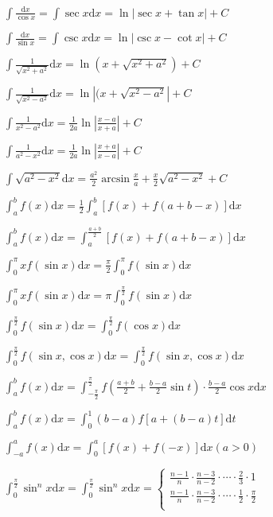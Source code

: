 \begin{spacing}{\hangju}
    \noindent $\int{\frac{\mathrm{d}x}{\cos{x}}} = \int{\sec{x}}\mathrm{d}x = \ln{\left| \sec{x} + \tan{x} \right| } + C$

    \noindent $\int{\frac{\mathrm{d}x}{\sin{x}}} = \int{\csc{x}}\mathrm{d}x = \ln{\left| \csc{x} - \cot{x} \right| } + C$

    \noindent $\int{\frac{1}{\sqrt{x^2 + a^2}}}\mathrm{d}x = \ln{(x + \sqrt{x^2 + a ^2})} + C$

    \noindent $\int{\frac{1}{\sqrt{x^2 - a^2}}}\mathrm{d}x = \ln{\left|(x + \sqrt{x^2 - a ^2}\right|} + C$

    \noindent $\int{\frac{1}{x^2 - a^2}} \mathrm{d}x = \frac{1}{2a} \ln{\left| \frac{x - a}{x + a} \right|} + C$

    \noindent $\int{\frac{1}{a^2 - x^2}} \mathrm{d}x = \frac{1}{2a} \ln{\left| \frac{x + a}{x - a} \right|} + C$

    \noindent $\int{\sqrt{a^2 - x^2}}\mathrm{d}x = \frac{a^2}{2}\arcsin{\frac{x}{a}} + \frac{x}{2}\sqrt{a^2 - x^2} + C$

    \noindent $\int_{a}^{b}{f(x)}\mathrm{d}x = \frac{1}{2}\int_{a}^{b}{[f(x) + f(a + b - x)]}\mathrm{d}x$

    \noindent $\int_{a}^{b}{f(x)}\mathrm{d}x = \int_{a}^{\frac{a+b}{2}}{[f(x) + f(a + b - x)]}\mathrm{d}x$

    \noindent $\int_{0}^{\pi}{xf(\sin{x})}\mathrm{d}x = \frac{\pi}{2}\int_{0}^{\pi}{f(\sin{x})}\mathrm{d}x$

    \noindent $\int_{0}^{\pi}{xf(\sin{x})}\mathrm{d}x = \pi\int_{0}^{\frac{\pi}{2}}{f(\sin{x})}\mathrm{d}x$

    \noindent $\int_{0}^{\frac{\pi}{2}}{f(\sin{x})}\mathrm{d}x = \int_{0}^{\frac{\pi}{2}}{f(\cos{x})}\mathrm{d}x $

    \noindent $\int_{0}^{\frac{\pi}{2}}{f(\sin{x}, \cos{x})}\mathrm{d}x = \int_{0}^{\frac{\pi}{2}}{f(\sin{x}, \cos{x})}\mathrm{d}x $

    \noindent $\int_{a}^{b}{f(x)}\mathrm{d}x = \int_{-\frac{\pi}{2}}^{\frac{\pi}{2}}{f(\frac{a + b}{2} + \frac{b - a}{2}\sin{t}) \cdot \frac{b - a}{2}\cos{x}}\mathrm{d}x$

    \noindent $\int_{a}^{b}{f(x)}\mathrm{d}x = \int_{0}^{1}(b - a)f[a + (b - a)t]\mathrm{d}t$

    \noindent $\int_{-a}^{a}{f(x)}\mathrm{d}x = \int_{0}^{a}[f(x) + f(-x)]\mathrm{d}x (a > 0)$

    \noindent $\int_{0}^{\frac{\pi}{2}}{\sin^n{x}}\mathrm{d}x = \int_{0}^{\frac{\pi}{2}}{\sin^n{x}}\mathrm{d}x = \left\{ \begin{array}{l}
        \frac{n - 1}{n} \cdot \frac{n - 3}{n - 2} \cdot \cdots  \cdot \frac{2}{3} \cdot 1 \\
        \frac{n - 1}{n} \cdot \frac{n - 3}{n - 2} \cdot \cdots  \cdot \frac{1}{2} \cdot \frac{\pi}{2} \\
    \end{array}\right.$


\end{spacing}
